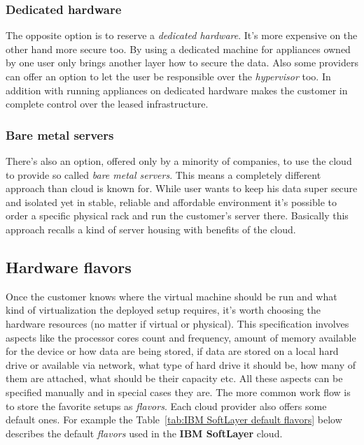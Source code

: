 \subsubsection{Dedicated hardware}
\label{subs:Dedicated hardware}

The opposite option is to reserve a \emph{dedicated hardware}. It's more expensive on the other hand more secure too. By using a dedicated machine for appliances owned by one user only brings another layer how to secure the data. Also some providers can offer an option to let the user be responsible over the \emph{hypervisor} too. In addition with running appliances on dedicated hardware makes the customer in complete control over the leased infrastructure.

\subsubsection{Bare metal servers}
\label{subs:Bare metal servers}

There's also an option, offered only by a minority of companies, to use the cloud to provide so called \emph{bare metal servers}. This means a completely different approach than cloud is known for. While user wants to keep his data super secure and isolated yet in stable, reliable and affordable environment it's possible to order a specific physical rack and run the customer's server there. Basically this approach recalls a kind of server housing with benefits of the cloud.

\subsection{Hardware flavors}
\label{sub:Hardware flavors}

Once the customer knows where the virtual machine should be run and what kind of virtualization the deployed setup requires, it's worth choosing the hardware resources (no matter if virtual or physical). This specification involves aspects like the processor cores count and frequency, amount of memory available for the device or how data are being stored, if data are stored on a local hard drive or available via network, what type of hard drive it should be, how many of them are attached, what should be their capacity etc. All these aspects can be specified manually and in special cases they are. The more common work flow is to store the favorite setups as \emph{flavors}. Each cloud provider also offers some default ones. For example the Table~\ref{tab:IBM SoftLayer default flavors} below describes the default \emph{flavors} used in the \textbf{IBM SoftLayer} cloud.

